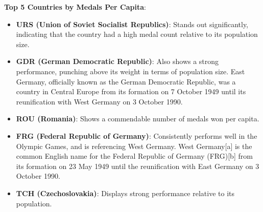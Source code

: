 \documentclass[12pt,preprint, authoryear]{elsarticle}
\numberwithin{equation}{section}
\numberwithin{figure}{section}
\numberwithin{table}{section}
\begin{document}
\textbf{Top 5 Countries by Medals Per Capita}:

\begin{itemize}
\item
  \textbf{URS (Union of Soviet Socialist Republics)}: Stands out
  significantly, indicating that the country had a high medal count
  relative to its population size.
\item
  \textbf{GDR (German Democratic Republic)}: Also shows a strong
  performance, punching above its weight in terms of population size.
  East Germany, officially known as the German Democratic Republic, was
  a country in Central Europe from its formation on 7 October 1949 until
  its reunification with West Germany on 3 October 1990.
\item
  \textbf{ROU (Romania)}: Shows a commendable number of medals won per
  capita.
\item
  \textbf{FRG (Federal Republic of Germany)}: Consistently performs well
  in the Olympic Games, and is referencing West Germany. West
  Germany{[}a{]} is the common English name for the Federal Republic of
  Germany (FRG){[}b{]} from its formation on 23 May 1949 until the
  reunification with East Germany on 3 October 1990.
\item
  \textbf{TCH (Czechoslovakia)}: Displays strong performance relative to
  its population.
\end{itemize}
\end{document}
